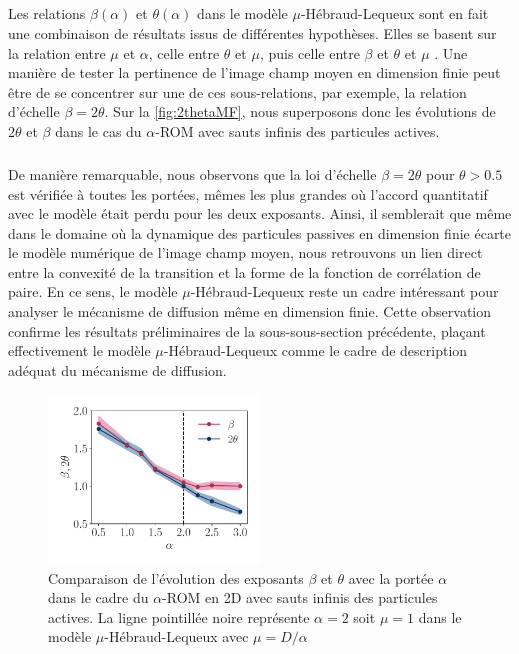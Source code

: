 \subparagraph{}Les relations $\beta(\alpha)$ et $\theta(\alpha)$ dans le modèle $\mu$-Hébraud-Lequeux sont en fait une combinaison de résultats issus de différentes hypothèses. Elles se basent sur la relation entre $\mu$ et $\alpha$, celle entre $\theta$ et $\mu$, puis celle entre $\beta$ et $\theta$ et $\mu$ \cite{lin_microscopic_2018}. Une manière de tester la pertinence de l'image champ moyen en dimension finie peut être de se concentrer sur une de ces sous-relations, par exemple, la relation d'échelle $\beta = 2\theta$. Sur la \autoref{fig:2thetaMF}, nous superposons donc les évolutions de $2\theta$ et $\beta$ dans le cas du $\alpha$-ROM avec sauts infinis des particules actives. 

\subparagraph{}De manière remarquable, nous observons que la loi d'échelle $\beta = 2\theta$ pour $\theta > 0.5$ est vérifiée à toutes les portées, mêmes les plus grandes où l'accord quantitatif avec le modèle était perdu pour les deux exposants. Ainsi, il semblerait que même dans le domaine où la dynamique des particules passives en dimension finie écarte le modèle numérique de l'image champ moyen, nous retrouvons un lien direct entre la convexité de la transition et la forme de la fonction de corrélation de paire. En ce sens, le modèle $\mu$-Hébraud-Lequeux reste un cadre intéressant pour analyser le mécanisme de diffusion même en dimension finie. Cette observation confirme les résultats préliminaires de la sous-sous-section précédente, plaçant effectivement le modèle $\mu$-Hébraud-Lequeux comme le cadre de description adéquat du mécanisme de diffusion.

\begin{figure}[h]
	\centering
	\includegraphics[width=0.5\textwidth]{Chapitre3/Figures/Interpretation/beta_theta_alphaMF.pdf}
	\caption{Comparaison de l'évolution des exposants $\beta$ et $\theta$ avec la portée $\alpha$ dans le cadre du $\alpha$-ROM en 2D avec sauts infinis des particules actives. La ligne pointillée noire représente $\alpha = 2$ soit $\mu=1$ dans le modèle $\mu$-Hébraud-Lequeux avec $\mu=D/\alpha$}
	\label{fig:2thetaMF}
\end{figure}


